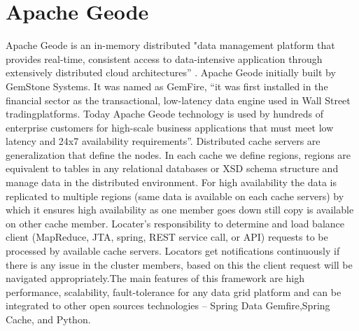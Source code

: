 \section{Apache Geode}

Apache Geode is an in-memory distributed "data management platform that provides real-time, 
consistent access to data-intensive application through extensively distributed cloud 
architectures” \cite{hid-sp18-514-apachegeodewiki}. Apache Geode initially built by GemStone Systems. 
It was named as GemFire, “it was first installed in the financial sector as the transactional, 
low-latency data engine used in Wall Street tradingplatforms. Today Apache Geode technology is used 
by hundreds of enterprise customers for high-scale business applications that must meet low latency 
and 24x7 availability requirements”\cite{hid-sp18-514-apachegeodewiki}.
Distributed cache servers are generalization that define the nodes. In each cache we define regions, 
regions are equivalent to tables in any relational databases or XSD schema structure and manage data in the distributed environment. 
For high availability the data is replicated to multiple regions (same data is available on each cache servers) by which it ensures 
high availability as one member goes down still copy is available on other cache member. Locater’s responsibility to determine 
and load balance client (MapReduce, JTA, spring, REST service call, or API) requests to be processed by available cache servers.
Locators get notifications continuously if there is any issue in the cluster members, based on this the client request will
be navigated appropriately\cite{hid-sp18-514-apachegeodewiki}.The main features of this framework are high performance, 
scalability, fault-tolerance for any data grid platform and can be integrated to other open sources 
technologies – Spring Data Gemfire\cite{hid-sp18-514-geodespringgemfire},Spring 
Cache\cite{hid-sp18-514-geodespringcache}, and Python\cite{hid-sp18-514-geodepython}.
